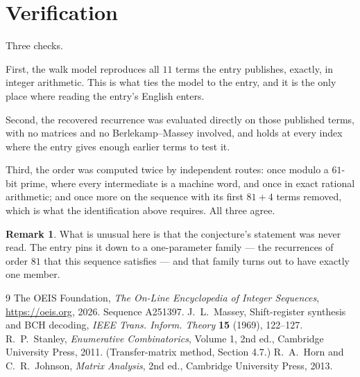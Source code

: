 \documentclass[11pt,a4paper]{article}
\theoremstyle{plain}
\theoremstyle{definition}
\newtheorem{remark}[theorem]{Remark}
\begin{document}
\section{Verification}

Three checks.

First, the walk model reproduces all $11$ terms the entry publishes, exactly, in integer
arithmetic. This is what ties the model to the entry, and it is the only place where reading
the entry's English enters.

Second, the recovered recurrence was evaluated directly on those published terms, with no
matrices and no Berlekamp--Massey involved, and holds at every index where the entry gives
enough earlier terms to test it.

Third, the order was computed twice by independent routes: once modulo a $61$-bit prime, where
every intermediate is a machine word, and once in exact rational arithmetic; and once more on
the sequence with its first $81+4$ terms removed, which is what the identification above
requires. All three agree.

\begin{remark}
What is unusual here is that the conjecture's statement was never read. The entry pins it down
to a one-parameter family --- the recurrences of order $81$ that this sequence satisfies
--- and that family turns out to have exactly one member.
\end{remark}

\begin{thebibliography}{9}
 The OEIS Foundation, \emph{The On-Line Encyclopedia of Integer
Sequences}, \url{https://oeis.org}, 2026. Sequence A251397.
 J.~L.~Massey, Shift-register synthesis and BCH decoding, \emph{IEEE
Trans. Inform. Theory} \textbf{15} (1969), 122--127.
 R.~P.~Stanley, \emph{Enumerative Combinatorics}, Volume 1, 2nd ed.,
Cambridge University Press, 2011. (Transfer-matrix method, Section 4.7.)
 R.~A.~Horn and C.~R.~Johnson, \emph{Matrix Analysis}, 2nd ed., Cambridge
University Press, 2013.
\end{thebibliography}
\end{document}
